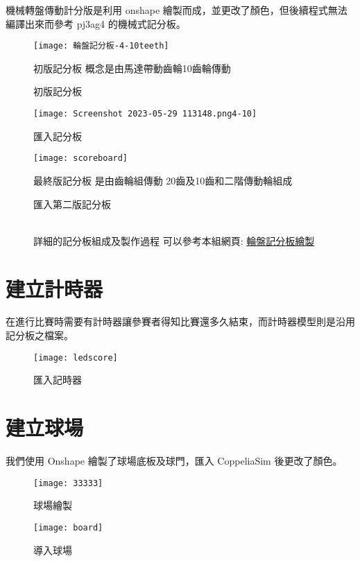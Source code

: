 機械轉盤傳動計分版是利用 onshape 繪製而成，並更改了顏色，但後續程式無法編譯出來而參考 pj3ag4 的機械式記分板。\\
\begin{figure}[hbt!]
\begin{center}
\texttt{[image: 輪盤記分板-4-10teeth]}
\caption{\Large 初版記分板}\label{初版記分板}
初版記分板 概念是由馬達帶動齒輪10齒輪傳動
\end{center}
\end{figure}
\begin{figure}[hbt!]
\begin{center}
\texttt{[image: Screenshot 2023-05-29 113148.png4-10]}
\caption{\Large 匯入記分板}\label{匯入記分板}
\end{center}
\end{figure}
\begin{figure}[hbt!]
\begin{center}
\texttt{[image: scoreboard]}
\caption{\Large 匯入第二版記分板}\label{匯入最終版記分板}
最終版記分板 是由齒輪組傳動 20齒及10齒和二階傳動輪組成
\end{center}
\end{figure}
\begin{figure}
\begin{center}
\\詳細的記分板組成及製作過程 可以參考本組網頁:
\href{https://mdecd2023.github.io/2a3-pj3ag1/content/輪盤記分板繪製.html}{輪盤記分板繪製}\\
\end{center}
\end{figure}

\section{建立計時器}
在進行比賽時需要有計時器讓參賽者得知比賽還多久結束，而計時器模型則是沿用記分板之檔案。\\
\begin{figure}[hbt!]
\begin{center}
\texttt{[image: ledscore]}
\caption{\Large 匯入記時器}\label{匯入記時器}
\end{center}
\end{figure}

\section{建立球場}
我們使用 Onshape 繪製了球場底板及球門，匯入 CoppeliaSim 後更改了顏色。\\
\begin{figure}[hbt!]
\begin{center}
\texttt{[image: 33333]}
\caption{\Large 球場繪製}\label{球場繪製}
\end{center}
\end{figure}
\begin{figure}[hbt!]
\begin{center}
\texttt{[image: board]}
\caption{\Large 導入球場}\label{導入球場}
\end{center}
\end{figure}
\newpage

\renewcommand{\baselinestretch}{0.5} %